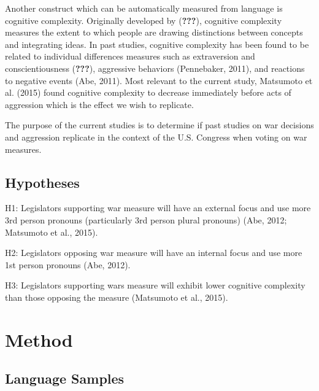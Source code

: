 \documentclass[english,,man]{apa6}
\begin{document}
Another construct which can be automatically measured from language is cognitive complexity. Originally developed by ({\textbf{???}}), cognitive complexity measures the extent to which people are drawing distinctions between concepts and integrating ideas. In past studies, cognitive complexity has been found to be related to individual differences measures such as extraversion and conscientiousness ({\textbf{???}}), aggressive behaviors (Pennebaker, 2011), and reactions to negative events (Abe, 2011). Most relevant to the current study, Matsumoto et al. (2015) found cognitive complexity to decrease immediately before acts of aggression which is the effect we wish to replicate.

The purpose of the current studies is to determine if past studies on war decisions and aggression replicate in the context of the U.S. Congress when voting on war measures.

\hypertarget{hypotheses}{%
\subsection{Hypotheses}\label{hypotheses}}

H1: Legislators supporting war measure will have an external focus and use more 3rd person pronouns (particularly 3rd person plural pronouns) (Abe, 2012; Matsumoto et al., 2015).

H2: Legislators opposing war measure will have an internal focus and use more 1st person pronouns (Abe, 2012).

H3: Legislators supporting wars measure will exhibit lower cognitive complexity than those opposing the measure (Matsumoto et al., 2015).

\hypertarget{method}{%
\section{Method}\label{method}}

\hypertarget{language-samples}{%
\subsection{Language Samples}\label{language-samples}}
\end{document}
